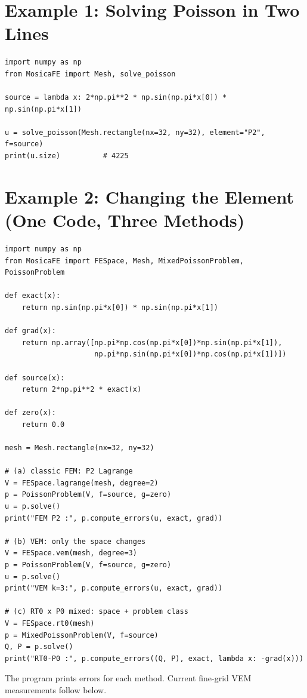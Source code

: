 \documentclass[11pt,oneside]{book}
\theoremstyle{definition}
\theoremstyle{plain}
\begin{document}
\section{Example 1: Solving Poisson in Two Lines}

\begin{lstlisting}[language=MosicaFE,caption={One-line solution}]
import numpy as np
from MosicaFE import Mesh, solve_poisson

source = lambda x: 2*np.pi**2 * np.sin(np.pi*x[0]) * np.sin(np.pi*x[1])

u = solve_poisson(Mesh.rectangle(nx=32, ny=32), element="P2", f=source)
print(u.size)          # 4225
\end{lstlisting}

\section{Example 2: Changing the Element (One Code, Three Methods)}

\begin{lstlisting}[language=MosicaFE,caption={FEM / VEM / RT0 share the same workflow},label={lst:three}]
import numpy as np
from MosicaFE import FESpace, Mesh, MixedPoissonProblem, PoissonProblem

def exact(x):
    return np.sin(np.pi*x[0]) * np.sin(np.pi*x[1])

def grad(x):
    return np.array([np.pi*np.cos(np.pi*x[0])*np.sin(np.pi*x[1]),
                     np.pi*np.sin(np.pi*x[0])*np.cos(np.pi*x[1])])

def source(x):
    return 2*np.pi**2 * exact(x)

def zero(x):
    return 0.0

mesh = Mesh.rectangle(nx=32, ny=32)

# (a) classic FEM: P2 Lagrange
V = FESpace.lagrange(mesh, degree=2)
p = PoissonProblem(V, f=source, g=zero)
u = p.solve()
print("FEM P2 :", p.compute_errors(u, exact, grad))

# (b) VEM: only the space changes
V = FESpace.vem(mesh, degree=3)
p = PoissonProblem(V, f=source, g=zero)
u = p.solve()
print("VEM k=3:", p.compute_errors(u, exact, grad))

# (c) RT0 x P0 mixed: space + problem class
V = FESpace.rt0(mesh)
p = MixedPoissonProblem(V, f=source)
Q, P = p.solve()
print("RT0-P0 :", p.compute_errors((Q, P), exact, lambda x: -grad(x)))
\end{lstlisting}

The program prints errors for each method. Current fine-grid VEM measurements follow below.
\end{document}
